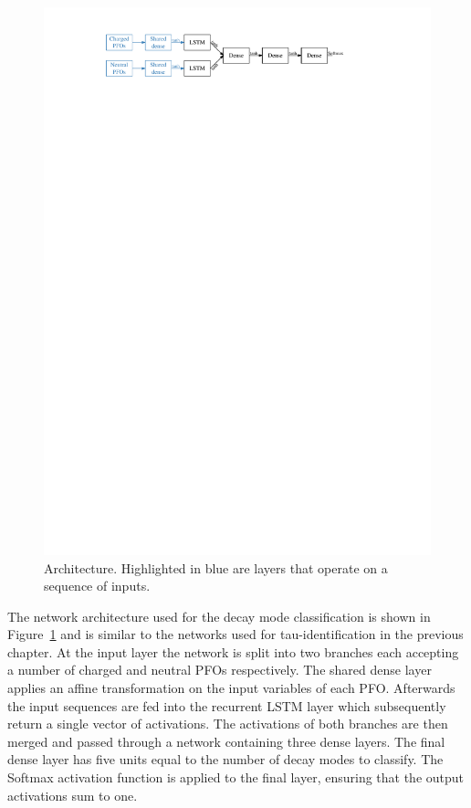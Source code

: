 \begin{figure}[htb]
  \centering
  \includegraphics{./figures/decay_mode_classification/baseline_architecture.pdf}
  \caption{Architecture. Highlighted in blue are layers that operate on a sequence of inputs.}
  \label{fig:pfo_rnn_baseline_arch}
\end{figure}

The network architecture used for the decay mode classification is shown in
Figure~\ref{fig:pfo_rnn_baseline_arch} and is similar to the networks used for
tau-identification in the previous chapter. At the input layer the network is
split into two branches each accepting a number of charged and neutral PFOs
respectively. The shared dense layer applies an affine transformation on the
input variables of each PFO. Afterwards the input sequences are fed into the
recurrent LSTM layer which subsequently return a single vector of activations.
The activations of both branches are then merged and passed through a network
containing three dense layers. The final dense layer has five units equal to the
number of decay modes to classify. The Softmax activation function is applied to
the final layer, ensuring that the output activations sum to one.

